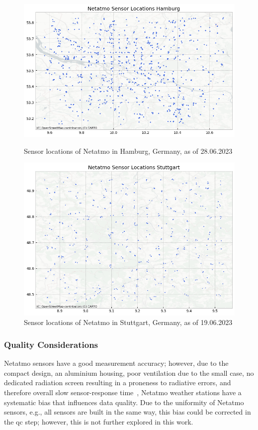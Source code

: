 \begin{figure}[htp]
    \centering
    \includegraphics[width=1\textwidth]{images/netatmo_sensor_locations_hamburg.png}
    \caption{Sensor locations of Netatmo in Hamburg, Germany, as of 28.06.2023}
    \label{fig:netatmo sensor locations hamburg}

    \includegraphics[width=1\textwidth]{images/netatmo_sensor_locations_stuttgart.png}
    \caption{Sensor locations of Netatmo in Stuttgart, Germany, as of 19.06.2023}
    \label{fig:netatmo sensor locations stuttgart}
\end{figure}

\subsubsection{Quality Considerations}

Netatmo sensors have a good measurement accuracy; however, due to the compact design, an aluminium housing, poor ventilation due to the small case, no dedicated radiation screen resulting in a proneness to radiative errors, and therefore overall slow sensor-response time~\cite{meier2017crowdsourcing, buchau2018modelling}, Netatmo weather stations have a systematic bias that influences data quality. Due to the uniformity of Netatmo sensors, e.g., all sensors are built in the same way, this bias could be corrected in the \gls{qc} step; however, this is not further explored in this work.

